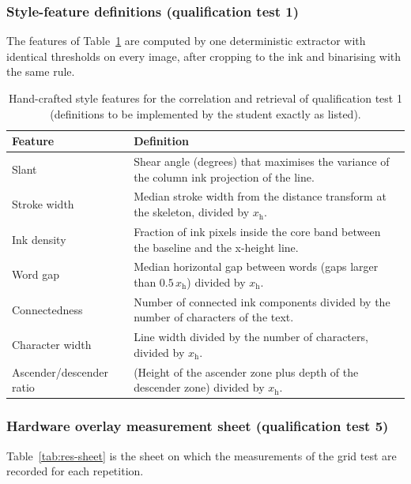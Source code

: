 \subsubsection{Style-feature definitions (qualification test 1)}

The features of Table~\ref{tab:res-features} are computed by one deterministic extractor with identical thresholds on every image, after cropping to the ink and binarising with the same rule.

\begin{table}[h]
\centering
\fontsize{10}{12}\selectfont
\begin{tabularx}{\linewidth}{|>{\raggedright\arraybackslash}p{3.3cm}|X|}
\hline
\textbf{Feature} & \textbf{Definition} \\
\hline
Slant & Shear angle (degrees) that maximises the variance of the column ink projection of the line. \\
\hline
Stroke width & Median stroke width from the distance transform at the skeleton, divided by $x_{\mathrm{h}}$. \\
\hline
Ink density & Fraction of ink pixels inside the core band between the baseline and the x-height line. \\
\hline
Word gap & Median horizontal gap between words (gaps larger than $0.5\,x_{\mathrm{h}}$) divided by $x_{\mathrm{h}}$. \\
\hline
Connectedness & Number of connected ink components divided by the number of characters of the text. \\
\hline
Character width & Line width divided by the number of characters, divided by $x_{\mathrm{h}}$. \\
\hline
Ascender/descender ratio & (Height of the ascender zone plus depth of the descender zone) divided by $x_{\mathrm{h}}$. \\
\hline
\end{tabularx}
\caption{Hand-crafted style features for the correlation and retrieval of qualification test 1 (definitions to be implemented by the student exactly as listed).}
\label{tab:res-features}
\end{table}

\subsubsection{Hardware overlay measurement sheet (qualification test 5)}

Table~\ref{tab:res-sheet} is the sheet on which the measurements of the grid test are recorded for each repetition.

